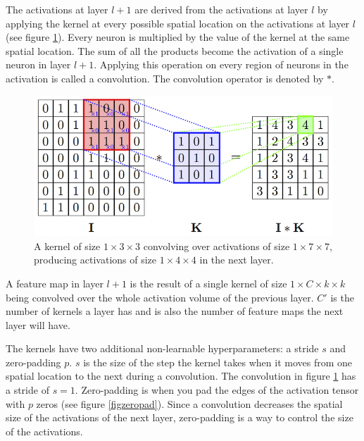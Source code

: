 \documentclass[a4paper, twoside]{article}
\begin{document}
The activations at layer $l+1$ are derived from the activations at layer $l$ by applying the kernel at every possible spatial location on the activations at layer $l$ (see figure \ref{figkonv}). Every neuron is multiplied by the value of the kernel at the same spatial location. The sum of all the products become the activation of a single neuron in layer $l+1$. Applying this operation on every region of neurons in the activation is called a convolution. The convolution operator is denoted by $*$. \cite{cs231n} \cite{convmath} \cite{convarithmetic}

\begin{figure}[h]
	\centering
  		\includegraphics[scale=2.1]{convolution.png}
  	\caption{A kernel of size $1 \times 3 \times 3$ convolving over activations of size $1 \times 7 \times 7$, producing activations of size $1 \times 4 \times 4$ in the next layer. \cite{figconv}} \label{figkonv}
\end{figure}

A feature map in layer $l+1$ is the result of a single kernel of size $1 \times C  \times k\times k$ being convolved over the whole activation volume of the previous layer. $C'$ is the number of kernels a layer has and is also the number of feature maps the next layer will have. \cite{cs231n} \cite{convmath}

The kernels have two additional non-learnable hyperparameters: a stride $s$ and zero-padding $p$. $s$ is the size of the step the kernel takes when it moves from one spatial location to the next during a convolution. The convolution in figure \ref{figkonv} has a stride of $s = 1$. Zero-padding is when you pad the edges of the activation tensor with $p$ zeros (see figure \ref{figzeropad}). Since a convolution decreases the spatial size of the activations of the next layer, zero-padding is a way to control the size of the activations. \cite{cs231n} \cite{convmath} \cite{convarithmetic}
\end{document}

